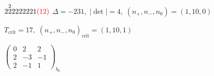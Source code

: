 \documentclass[10pt]{article}
\begin{document}
\smallskip

$2\overset{2}{2}2222221\textcolor{red}{(12)}$ \quad $\Delta=-231,\; |\det|=4,\; (n_+,n_-,n_0)=(1,10,0)$

\hspace{1em}$T_{\text{crit}}=17,\; (n_+,n_-,n_0)_{\text{crit}}=(1,10,1)$

\hspace{2em}$\left(\begin{smallmatrix}0 & 2 & 2 \\ 2 & -3 & -1 \\ 2 & -1 & 1\end{smallmatrix}\right)_{\!b_0}$
\end{document}
